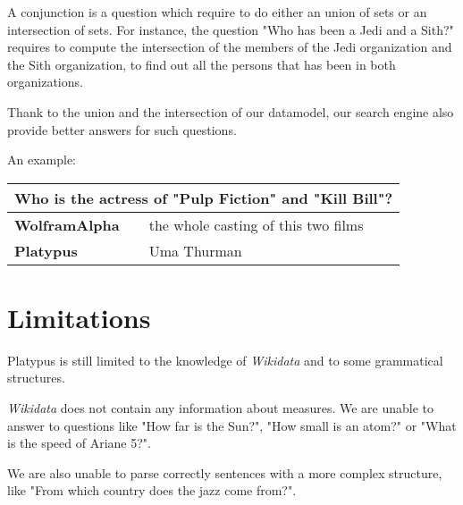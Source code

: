 A conjunction is a question which require to do either an union of sets or an intersection
of sets. For instance, the question "Who has been a Jedi and a Sith?" requires to
compute the intersection of the members of the Jedi organization and the Sith organization,
to find out all the persons that has been in both organizations.

Thank to the union and the intersection of our datamodel, our search engine also
provide better answers for such questions.

An example:

\begin{tabular}{l|l}
    \multicolumn{2}{l}{Who is the actress of "Pulp Fiction" and "Kill Bill"?} \\
    \hline
    \textbf{WolframAlpha} & the whole casting of this two films\\
    \textbf{Platypus} & Uma Thurman\\
\end{tabular}


\section{Limitations}

Platypus is still limited to the knowledge of \emph{Wikidata} and to some grammatical
structures.

\emph{Wikidata} does not contain any information about measures. We are unable
to answer to questions like "How far is the Sun?", "How small is an atom?" or
"What is the speed of Ariane 5?".

We are also unable to parse correctly sentences with a more complex structure, like
"From which country does the jazz come from?".
